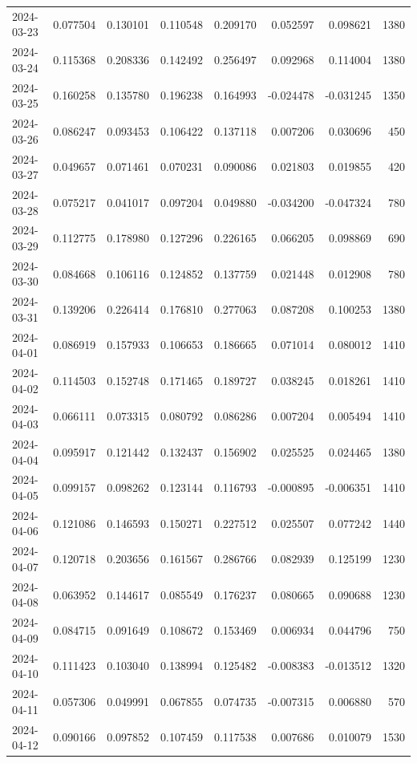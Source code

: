 \begin{tabular}{lrrrrrrr}
2024-03-23 & 0.077504 & 0.130101 & 0.110548 & 0.209170 & 0.052597 & 0.098621 & 1380 \\
2024-03-24 & 0.115368 & 0.208336 & 0.142492 & 0.256497 & 0.092968 & 0.114004 & 1380 \\
2024-03-25 & 0.160258 & 0.135780 & 0.196238 & 0.164993 & -0.024478 & -0.031245 & 1350 \\
2024-03-26 & 0.086247 & 0.093453 & 0.106422 & 0.137118 & 0.007206 & 0.030696 & 450 \\
2024-03-27 & 0.049657 & 0.071461 & 0.070231 & 0.090086 & 0.021803 & 0.019855 & 420 \\
2024-03-28 & 0.075217 & 0.041017 & 0.097204 & 0.049880 & -0.034200 & -0.047324 & 780 \\
2024-03-29 & 0.112775 & 0.178980 & 0.127296 & 0.226165 & 0.066205 & 0.098869 & 690 \\
2024-03-30 & 0.084668 & 0.106116 & 0.124852 & 0.137759 & 0.021448 & 0.012908 & 780 \\
2024-03-31 & 0.139206 & 0.226414 & 0.176810 & 0.277063 & 0.087208 & 0.100253 & 1380 \\
2024-04-01 & 0.086919 & 0.157933 & 0.106653 & 0.186665 & 0.071014 & 0.080012 & 1410 \\
2024-04-02 & 0.114503 & 0.152748 & 0.171465 & 0.189727 & 0.038245 & 0.018261 & 1410 \\
2024-04-03 & 0.066111 & 0.073315 & 0.080792 & 0.086286 & 0.007204 & 0.005494 & 1410 \\
2024-04-04 & 0.095917 & 0.121442 & 0.132437 & 0.156902 & 0.025525 & 0.024465 & 1380 \\
2024-04-05 & 0.099157 & 0.098262 & 0.123144 & 0.116793 & -0.000895 & -0.006351 & 1410 \\
2024-04-06 & 0.121086 & 0.146593 & 0.150271 & 0.227512 & 0.025507 & 0.077242 & 1440 \\
2024-04-07 & 0.120718 & 0.203656 & 0.161567 & 0.286766 & 0.082939 & 0.125199 & 1230 \\
2024-04-08 & 0.063952 & 0.144617 & 0.085549 & 0.176237 & 0.080665 & 0.090688 & 1230 \\
2024-04-09 & 0.084715 & 0.091649 & 0.108672 & 0.153469 & 0.006934 & 0.044796 & 750 \\
2024-04-10 & 0.111423 & 0.103040 & 0.138994 & 0.125482 & -0.008383 & -0.013512 & 1320 \\
2024-04-11 & 0.057306 & 0.049991 & 0.067855 & 0.074735 & -0.007315 & 0.006880 & 570 \\
2024-04-12 & 0.090166 & 0.097852 & 0.107459 & 0.117538 & 0.007686 & 0.010079 & 1530 \\

\end{tabular}
